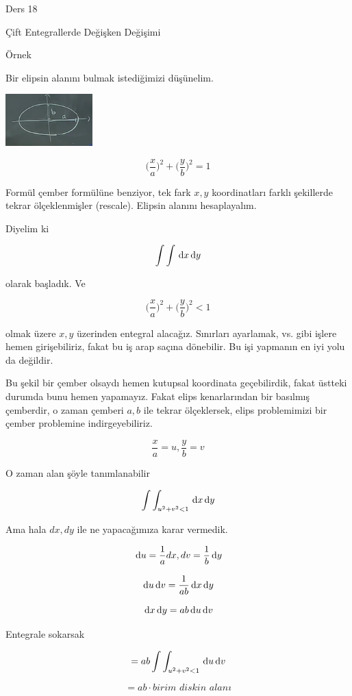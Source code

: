 \documentclass[12pt,fleqn]{article}\usepackage{../../common}
\begin{document}
Ders 18

Çift Entegrallerde Değişken Değişimi 

Örnek 

Bir elipsin alanını bulmak istediğimizi düşünelim. 

\begin{center}
\includegraphics[height=2cm]{18_1.png}
\end{center}

$$ \bigg(\frac{x}{a}\bigg)^2 + \bigg(\frac{y}{b}\bigg)^2 = 1 $$

Formül çember formülüne benziyor, tek fark $x,y$ koordinatları farklı
şekillerde tekrar ölçeklenmişler (rescale). Elipsin alanını hesaplayalım. 

Diyelim ki 

$$ \int \int \,\mathrm{d} x \,\mathrm{d} y $$

olarak başladık. Ve

$$ \bigg(\frac{x}{a}\bigg)^2 + \bigg(\frac{y}{b}\bigg)^2 < 1 $$

olmak üzere $x,y$ üzerinden entegral alacağız. Sınırları ayarlamak, vs. gibi
işlere hemen girişebiliriz, fakat bu iş arap saçına dönebilir. Bu işi yapmanın
en iyi yolu da değildir.

Bu şekil bir çember olsaydı hemen kutupsal koordinata geçebilirdik, fakat
üstteki durumda bunu hemen yapamayız. Fakat elips kenarlarından bir basılmış
çemberdir, o zaman çemberi $a,b$ ile tekrar ölçeklersek, elips problemimizi
bir çember problemine indirgeyebiliriz. 


$$ \frac{x}{a} = u, \frac{y}{b} = v $$

O zaman alan şöyle tanımlanabilir 

$$ \int \int_{u^2 + v^2 < 1} \,\mathrm{d} x \,\mathrm{d} y $$

Ama hala $dx,dy$ ile ne yapacağımıza karar vermedik. 

$$ \,\mathrm{d} u = \frac{1}{a}dx,dv = \frac{1}{b} \,\mathrm{d} y $$

$$ \,\mathrm{d} u \,\mathrm{d} v = \frac{1}{ab} \,\mathrm{d} x \,\mathrm{d} y $$

$$ \,\mathrm{d} x \,\mathrm{d} y = ab \,\mathrm{d} u \,\mathrm{d} v $$

Entegrale sokarsak

$$ = ab \int \int_{u^2 + v^2 < 1} \,\mathrm{d} u \,\mathrm{d} v $$

$$ = ab \cdot \textit{birim diskin alanı} $$
\end{document}
